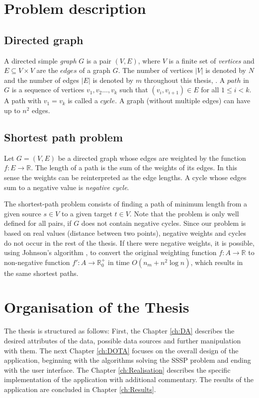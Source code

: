 \documentclass[thesis=M,english]{FITthesis}[2012/10/20]
\begin{document}
\section{Problem description}

\subsection{Directed graph}
A directed simple \textit{graph} $G$ is a pair $(V, E)$, where $V$ is a finite set of \textit{vertices} and $E \subseteq V \times V$ are the $edges$ of a graph $G$. The number of vertices $|V|$ is denoted by $N$ and the number of edges $|E|$ is denoted by $m$ throughout this thesis, . A $path$ in $G$ is a sequence of vertices $v_1, v_2 \dots ,v_k$ such that $(v_i,v_{i+1}) \in E$ for all $1 \leq i < k$. A path with $v_1 = v_k$ is called a $cycle$. A graph (without multiple edges) can have up to $n^2$ edges. 


\subsection{Shortest path problem}
\label{sec:SPP}
Let $G = (V, E)$ be a directed graph whose edges are weighted by the function $f: E \to \mathbb{R}$. 
The length of a path is the sum of the weights of its edges. In this sense the weights can be reinterpreted as the edge lengths. A cycle whose edges sum to a negative value is \textit{negative cycle}.  

The shortest-path problem consists of finding a path of minimum length from a given source $s \in V$ to a given target $t \in V$.
Note that the problem is only well defined for all pairs, if $G$ does not contain negative cycles.
Since our problem is based on real values (distance between two points), negative weights and cycles do not occur in the rest of the thesis.
If there were negative weights, it is possible, using Johnson's algorithm \cite{Johnson77}, to convert the original weighting function $f: A \to \mathbb{R}$ to non-negative function $ f': A \to \mathbb{R}^+_0$ in time $O(n_m + n^2 \log n)$, which results in the same shortest paths.

\section{Organisation of the Thesis}
The thesis is structured as follows: First, the Chapter \ref{ch:DA} describes the desired attributes of the data, possible data sources and further manipulation with them. 
The next Chapter \ref{ch:DOTA} focuses on the overall design of the application, beginning with the algorithms solving the SSSP problem and ending with the user interface.   
The Chapter \ref{ch:Realisation} describes the specific implementation of the application with additional commentary. 
The results of the application are concluded in Chapter \ref{ch:Results}.
\end{document}
